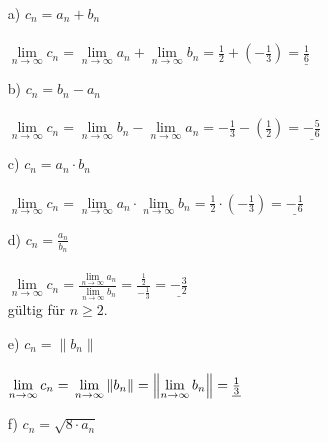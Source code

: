 \documentclass{scrreprt}
\begin{document}
\begin{enumerate}
{            \begin{enumerate}
                \item [a)]{
                    $c_n = a_n + b_n$\\\\
                    $\lim \limits_{n \to \infty} c_n =
                    \lim \limits_{n \to \infty} a_n + \lim \limits_{n \to \infty} b_n =
                    \frac{1}{2}+(-\frac{1}{3})= \underline{\frac{1}{6}}$
                }
                \item [b)]{
                    $c_n = b_n - a_n$\\\\
                    $\lim \limits_{n \to \infty} c_n =
                    \lim \limits_{n \to \infty} b_n - \lim \limits_{n \to \infty} a_n =
                    -\frac{1}{3}-(\frac{1}{2})= \underline{-\frac{5}{6}}$
                }
                \item [c)]{
                    $c_n = a_n \cdot b_n$\\\\
                    $\lim \limits_{n \to \infty} c_n =
                    \lim \limits_{n \to \infty} a_n \cdot \lim \limits_{n \to \infty} b_n =
                    \frac{1}{2}\cdot(-\frac{1}{3})= \underline{-\frac{1}{6}}$
                }
                \item [d)]{
                    $c_n = \frac{a_n}{b_n}$\\\\
                    $\lim \limits_{n \to \infty} c_n =
                    \frac{\lim \limits_{n \to \infty} a_n} {\lim \limits_{n \to \infty} b_n} =
                    \frac {\frac{1}{2}}{-\frac{1}{3}}= \underline{-\frac{3}{2}}$\\
                    gültig für $n\geq 2$.
                }
                \item [e)]{
                    $c_n = \left\| b_n \right\|$\\\\
                    $\lim \limits_{n \to \infty} c_n =\\
                    \lim \limits_{n \to \infty} \left\| b_n \right\| =
                    \left\| \lim \limits_{n \to \infty} b_n \right\| =\\
                    \underline{\frac{1}{3}}$\\
                }
                \item [f)]{
                    $c_n = \sqrt{8\cdot a_n}$\\\\
}
\end{enumerate}}
\end{enumerate}
\end{document}
